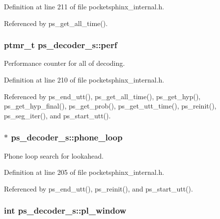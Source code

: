 Definition at line 211 of file pocketsphinx\+\_\+internal.\+h.



Referenced by ps\+\_\+get\+\_\+all\+\_\+time().

\subsubsection[{perf}]{\setlength{\rightskip}{0pt plus 5cm}ptmr\+\_\+t ps\+\_\+decoder\+\_\+s\+::perf}\label{structps__decoder__s_ab42d1d1e300d2a6df5dd3cd796a27d43}


Performance counter for all of decoding. 



Definition at line 210 of file pocketsphinx\+\_\+internal.\+h.



Referenced by ps\+\_\+end\+\_\+utt(), ps\+\_\+get\+\_\+all\+\_\+time(), ps\+\_\+get\+\_\+hyp(), ps\+\_\+get\+\_\+hyp\+\_\+final(), ps\+\_\+get\+\_\+prob(), ps\+\_\+get\+\_\+utt\+\_\+time(), ps\+\_\+reinit(), ps\+\_\+seg\+\_\+iter(), and ps\+\_\+start\+\_\+utt().

\subsubsection[{phone\+\_\+loop}]{$\ast$ ps\+\_\+decoder\+\_\+s\+::phone\+\_\+loop}\label{structps__decoder__s_a0c6d141d7a71a1287be00a1ebcc7643d}


Phone loop search for lookahead. 



Definition at line 205 of file pocketsphinx\+\_\+internal.\+h.



Referenced by ps\+\_\+end\+\_\+utt(), ps\+\_\+reinit(), and ps\+\_\+start\+\_\+utt().

\subsubsection[{pl\+\_\+window}]{\setlength{\rightskip}{0pt plus 5cm}int ps\+\_\+decoder\+\_\+s\+::pl\+\_\+window}\label{structps__decoder__s_a0f0a6681ffd98af789f6bed556c814e4}


